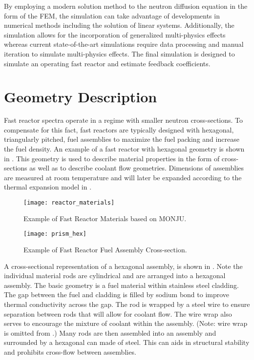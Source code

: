   By employing a modern solution method to the neutron diffusion
  equation in the form of the FEM, the simulation can take advantage of 
  developments in numerical methods including the solution of linear systems. 
  Additionally, the simulation allows for the incorporation of generalized 
  multi-physics effects whereas current state-of-the-art simulations require 
  data processing and manual iteration to simulate multi-physics effects. The 
  final simulation is designed to simulate an operating fast reactor and 
  estimate feedback coefficients.

\section{Geometry Description}
  \label{sec:geometry_description}
  Fast reactor spectra operate in a regime with smaller neutron cross-sections.
  To compensate for this fact, fast reactors are typically designed with 
  hexagonal, triangularly pitched, fuel assemblies to maximize the fuel packing 
  and increase the fuel density. An example of a fast reactor with hexagonal 
  geometry is shown in .
  This geometry is used to describe material properties in the form of 
  cross-sections as well as to describe coolant flow geometries. Dimensions of 
  assemblies are measured at room temperature and will later be expanded 
  according to the thermal expansion model in .
  
  \begin{figure}
    \centering
    \texttt{[image: reactor\_materials]}
    \caption{Example of Fast Reactor Materials based on MONJU.}
    \label{fig:reactor_materials}
  \end{figure}

  \begin{figure}
    \centering
    \texttt{[image: prism\_hex]}
    \caption{Example of Fast Reactor Fuel Assembly Cross-section.}
    \label{fig:prism_hex}
  \end{figure}

  A cross-sectional representation of a hexagonal assembly, is shown in 
  . 
  Note the individual material rods are cylindrical and are arranged
  into a hexagonal assembly. The basic geometry is a fuel material within
  stainless steel cladding. The gap between the fuel and cladding is filled by
  sodium bond to improve thermal conductivity across the gap. The rod is
  wrapped by a steel wire to ensure separation between rods that will allow for
  coolant flow. The wire wrap also serves to encourage the mixture of coolant
  within the assembly. (Note: wire wrap is omitted from .) 
  Many rods are then assembled into an assembly and surrounded by a hexagonal 
  can made of steel. This can aids in structural stability and prohibits 
  cross-flow between assemblies. 

